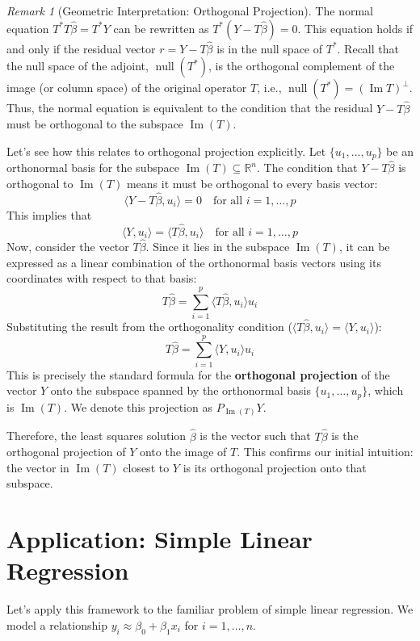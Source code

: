 \documentclass[11pt]{article}
\theoremstyle{definition}
\theoremstyle{remark}
\newtheorem{remark}[theorem]{Remark}
\newcommand{\R}{\mathbb{R}} %
\newcommand{\inner}[2]{\langle #1, #2 \rangle} %
\DeclareMathOperator{\nullspace}{null} %
\DeclareMathOperator{\im}{Im} %
\begin{document}
\begin{remark}[Geometric Interpretation: Orthogonal Projection] \label{rem:geometric_interpretation}
The normal equation $T^* T \hat{\beta} = T^* Y$ can be rewritten as $T^* (Y - T\hat{\beta}) = 0$. This equation holds if and only if the residual vector $r = Y - T\hat{\beta}$ is in the null space of $T^*$. Recall that the null space of the adjoint, $\nullspace(T^*)$, is the orthogonal complement of the image (or column space) of the original operator $T$, i.e., $\nullspace(T^*) = (\im T)^\perp$.
Thus, the normal equation is equivalent to the condition that the residual $Y - T\hat{\beta}$ must be orthogonal to the subspace $\im(T)$.

Let's see how this relates to orthogonal projection explicitly. Let $\{u_1, \dots, u_p\}$ be an orthonormal basis for the subspace $\im(T) \subseteq \R^n$. The condition that $Y - T\hat{\beta}$ is orthogonal to $\im(T)$ means it must be orthogonal to every basis vector:
\[
\inner{Y - T\hat{\beta}}{u_i} = 0 \quad \text{for all } i=1, \dots, p
\]
This implies that
\[
\inner{Y}{u_i} = \inner{T\hat{\beta}}{u_i} \quad \text{for all } i=1, \dots, p
\]
Now, consider the vector $T\hat{\beta}$. Since it lies in the subspace $\im(T)$, it can be expressed as a linear combination of the orthonormal basis vectors using its coordinates with respect to that basis:
\[
T\hat{\beta} = \sum_{i=1}^p \inner{T\hat{\beta}}{u_i} u_i
\]
Substituting the result from the orthogonality condition ($\inner{T\hat{\beta}}{u_i} = \inner{Y}{u_i}$):
\[
T\hat{\beta} = \sum_{i=1}^p \inner{Y}{u_i} u_i
\]
This is precisely the standard formula for the \textbf{orthogonal projection} of the vector $Y$ onto the subspace spanned by the orthonormal basis $\{u_1, \dots, u_p\}$, which is $\im(T)$. We denote this projection as $P_{\im(T)} Y$.

Therefore, the least squares solution $\hat{\beta}$ is the vector such that $T\hat{\beta}$ is the orthogonal projection of $Y$ onto the image of $T$. This confirms our initial intuition: the vector in $\im(T)$ closest to $Y$ is its orthogonal projection onto that subspace.
\end{remark}

\section{Application: Simple Linear Regression}

Let's apply this framework to the familiar problem of simple linear regression. We model a relationship $y_i \approx \beta_0 + \beta_1 x_i$ for $i=1, \dots, n$.
\end{document}
